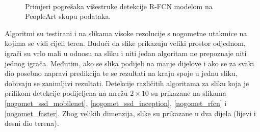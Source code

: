 \begin{figure}[H]
\begin{center}
 \
 \
\caption{Primjeri pogrešaka višestruke detekcije R-FCN modelom na PeopleArt skupu podataka.}
\label{ssd_greske}
\end{center}
\end{figure}

Algoritmi su testirani i na slikama visoke rezolucije s nogometne utakmice na kojima se vidi cijeli teren. Budući da slike prikazuju veliki prostor odjednom, igrači su vrlo mali u odnosu na sliku i niti jedan algoritam ne prepoznaje niti jednog igrača. Međutim, ako se slika podijeli na manje dijelove i ako se za svaki dio posebno napravi predikcija te se rezultati na kraju spoje u jednu sliku, dobivaju se zanimljivi rezultati. Detekcije različitih algoritama za sliku koja je prilikom detekcije podijeljena na mrežu $2 \times 10$ su prikazane na slikama \ref{nogomet_ssd_mobilenet}, \ref{nogomet_ssd_inception}, \ref{nogomet_rfcn} i \ref{nogomet_faster}. Zbog velikih dimenzija, slike su prikazane u dva dijela (lijevi i desni dio terena).

